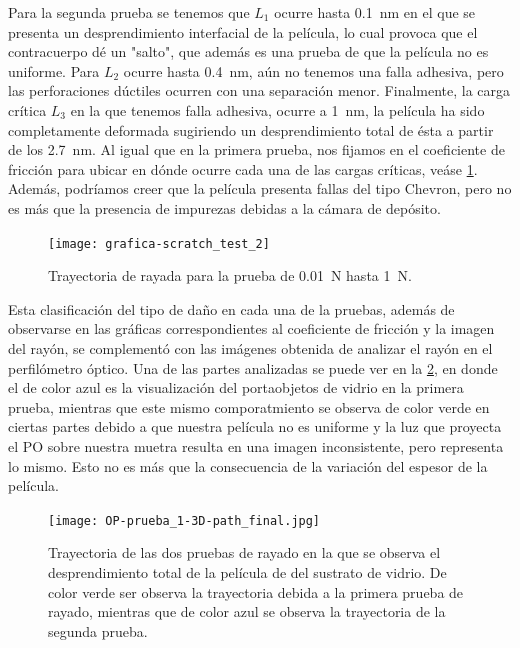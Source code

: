 \documentclass[12pt]{IEEEtran}
\begin{document}
Para la segunda prueba se tenemos que \(L_{1}\) ocurre hasta \qty{0.1}{\nm} en el que se presenta un desprendimiento interfacial de la película, lo cual provoca que el contracuerpo dé un "salto", que además es una prueba de que la película no es uniforme. Para \(L_{2}\) ocurre hasta \qty{0.4}{\nm}, aún no tenemos una falla adhesiva, pero las perforaciones dúctiles ocurren con una separación menor. Finalmente, la carga crítica \(L_{3}\) en la que tenemos falla adhesiva, ocurre a \qty{1}{\nm}, la película ha sido completamente deformada sugiriendo un desprendimiento total de ésta a partir de los \qty{2.7}{\nm}. Al igual que en la primera prueba, nos fijamos en el coeficiente de fricción para ubicar en dónde ocurre cada una de las cargas críticas, veáse \cref{fig:scratch-test-2}. Además, podríamos creer que la película presenta fallas del tipo Chevron, pero no es más que la presencia de impurezas debidas a la cámara de depósito.

\begin{figure}[htb]
	\centering
	\texttt{[image: grafica-scratch\_test\_2]}
	\caption{Trayectoria de rayada para la prueba de \qty{0.01}{\N} hasta \qty{1}{\N}.}
	\label{fig:scratch-test-2}
\end{figure}

Esta clasificación del tipo de daño en cada una de la pruebas, además de observarse en las gráficas correspondientes al coeficiente de fricción y la imagen del rayón, se complementó con las imágenes obtenida de analizar el rayón en el perfilómetro óptico. Una de las partes analizadas se puede ver en la \cref{fig:OP-scratch_path}, en donde el de color azul es la visualización del portaobjetos de vidrio en la primera prueba, mientras que este mismo comporatmiento se observa de color verde en ciertas partes debido a que nuestra película no es uniforme y la luz que proyecta el PO sobre nuestra muetra resulta en una imagen inconsistente, pero representa lo mismo. Esto no es más que la consecuencia de la variación del espesor de la película.

\begin{figure}[htb]
	\centering
	\texttt{[image: OP-prueba\_1-3D-path\_final.jpg]}
	\caption{Trayectoria de las dos pruebas de rayado en la que se observa el desprendimiento total de la película de  del sustrato de vidrio. De color verde ser observa la trayectoria debida a la primera prueba de rayado, mientras que de color azul se observa la trayectoria de la segunda prueba.}
	\label{fig:OP-scratch_path}
\end{figure}
\end{document}
